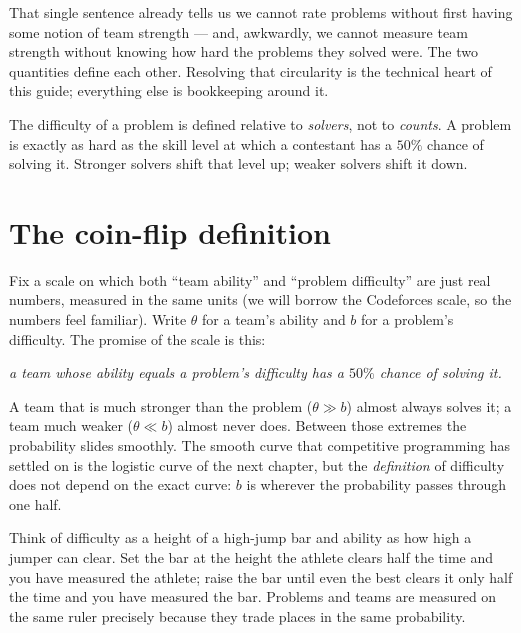 \documentclass[11pt]{report}
\theoremstyle{definition}
\numberwithin{equation}{chapter}
\begin{document}
That single sentence already tells us we cannot rate problems without first
having some notion of team strength --- and, awkwardly, we cannot measure team
strength without knowing how hard the problems they solved were. The two
quantities define each other. Resolving that circularity is the technical heart
of this guide; everything else is bookkeeping around it.

\begin{keyidea}
The difficulty of a problem is defined relative to \emph{solvers}, not to
\emph{counts}. A problem is exactly as hard as the skill level at which a
contestant has a $50\%$ chance of solving it. Stronger solvers shift that
level up; weaker solvers shift it down.
\end{keyidea}

\section{The coin-flip definition}

Fix a scale on which both ``team ability'' and ``problem difficulty'' are just
real numbers, measured in the same units (we will borrow the Codeforces scale, so
the numbers feel familiar). Write $\theta$ for a team's ability and $b$ for a
problem's difficulty. The promise of the scale is this:

\begin{center}
\emph{a team whose ability equals a problem's difficulty has a $50\%$ chance of
solving it.}
\end{center}

A team that is much stronger than the problem ($\theta \gg b$) almost always
solves it; a team much weaker ($\theta \ll b$) almost never does. Between those
extremes the probability slides smoothly. The smooth curve that competitive
programming has settled on is the logistic curve of the next chapter, but the
\emph{definition} of difficulty does not depend on the exact curve: $b$ is
wherever the probability passes through one half.

\begin{intuition}
Think of difficulty as a height of a high-jump bar and ability as how high a
jumper can clear. Set the bar at the height the athlete clears half the time and
you have measured the athlete; raise the bar until even the best clears it only
half the time and you have measured the bar. Problems and teams are measured on
the same ruler precisely because they trade places in the same probability.
\end{intuition}
\end{document}
